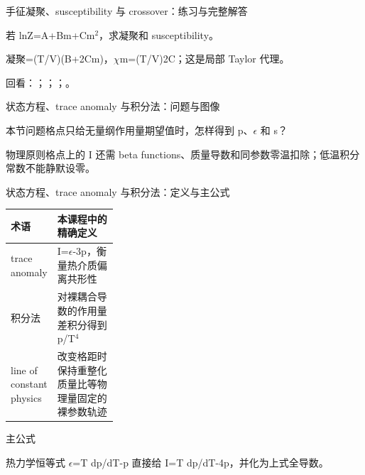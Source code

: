\begin{frame}[t]{手征凝聚、susceptibility 与 crossover：练习与完整解答}
\footnotesize
\begin{block}{}若 lnZ=A+Bm+Cm\ensuremath{^{2}}，求凝聚和 susceptibility。\end{block}
\begin{exampleblock}{}凝聚=(T/\allowbreak{}V)(B+2Cm)，\ensuremath{\chi}m=(T/\allowbreak{}V)2C；这是局部 Taylor 代理。\end{exampleblock}
\vfill
\scriptsize 回看：；；；。
\end{frame}

\begin{frame}[t]{状态方程、trace anomaly 与积分法：问题与图像}
\footnotesize
\begin{block}{本节问题}格点只给无量纲作用量期望值时，怎样得到 p、\ensuremath{\epsilon} 和 s？\end{block}
\begin{block}{物理原则}\quad 格点上的 I 还需 beta functions、质量导数和同参数零温扣除；低温积分常数不能静默设零。\end{block}
\end{frame}

\begin{frame}[t]{状态方程、trace anomaly 与积分法：定义与主公式}
\footnotesize\begin{tabularx}{\linewidth}{p{0.30\linewidth}Y}
\toprule 术语 & 本课程中的精确定义\\\midrule
{} trace anomaly & I=\ensuremath{\epsilon}-3p，衡量热介质偏离共形性\\
 积分法 & 对裸耦合导数的作用量差积分得到 p/\allowbreak{}T\ensuremath{^{4}}\\
 line of constant physics & 改变格距时保持重整化质量比等物理量固定的裸参数轨迹\\
\bottomrule\end{tabularx}\vspace{0.15cm}
\begin{block}{ 主公式}\centering{}\end{block}
热力学恒等式 \ensuremath{\epsilon}=T dp/\allowbreak{}dT-p 直接给 I=T dp/\allowbreak{}dT-4p，并化为上式全导数。
\end{frame}

